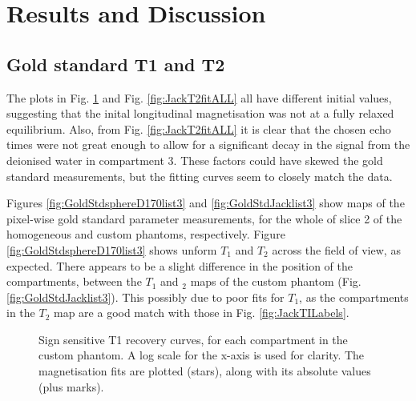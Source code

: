 \documentclass[journal]{IEEEtran}
\newlength\figureheight
\newlength\figurewidth
\begin{document}
\newpage

\section{Results and Discussion}
\subsection{Gold standard T1 and T2}
The plots in Fig. \ref{fig:JackT1fitALL} and Fig. \ref{fig:JackT2fitALL}  all have different initial values, suggesting that the inital longitudinal magnetisation was not at a fully relaxed equilibrium. Also, from Fig. \ref{fig:JackT2fitALL} it is clear that the chosen echo times were not great enough to allow for a significant decay in the signal from the deionised water in compartment 3. These factors could have skewed the gold standard measurements, but the fitting curves seem to closely match the data. 

Figures \ref{fig:GoldStdsphereD170list3} and \ref{fig:GoldStdJacklist3} show maps of the pixel-wise gold standard parameter measurements, for the whole of slice 2 of the homogeneous and custom phantoms, respectively. Figure \ref{fig:GoldStdsphereD170list3} shows unform $T_1$ and $T_2$ across the field of view, as expected. There appears to be a slight difference in the position of the compartments, between the $T_1$ and $_2$ maps of the custom phantom (Fig. \ref{fig:GoldStdJacklist3}). This possibly due to poor fits for $T_1$, as the compartments in the $T_2$ map are a good match with those in Fig. \ref{fig:JackTILabels}.

\begin{figure}
\centering
\begin{minipage}[c]{\columnwidth}
\setlength{}
\setlength{}



    \caption{Sign sensitive T1 recovery curves, for each compartment in the custom phantom. A log scale for the x-axis is used for clarity. The magnetisation fits are plotted (stars), along with its absolute values (plus marks). }
    \label{fig:JackT1fitALL}
\end{minipage}
\end{figure}
\end{document}
